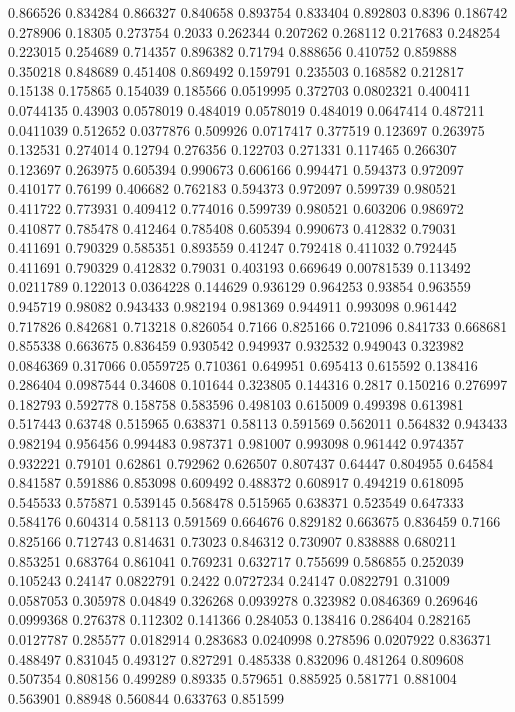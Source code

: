 0.866526 0.834284
0.866327 0.840658
0.893754 0.833404
0.892803 0.8396
0.186742 0.278906
0.18305 0.273754
0.2033 0.262344
0.207262 0.268112
0.217683 0.248254
0.223015 0.254689
0.714357 0.896382
0.71794 0.888656
0.410752 0.859888
0.350218 0.848689
0.451408 0.869492
0.159791 0.235503
0.168582 0.212817
0.15138 0.175865
0.154039 0.185566
0.0519995 0.372703
0.0802321 0.400411
0.0744135 0.43903
0.0578019 0.484019
0.0578019 0.484019
0.0647414 0.487211
0.0411039 0.512652
0.0377876 0.509926
0.0717417 0.377519
0.123697 0.263975
0.132531 0.274014
0.12794 0.276356
0.122703 0.271331
0.117465 0.266307
0.123697 0.263975
0.605394 0.990673
0.606166 0.994471
0.594373 0.972097
0.410177 0.76199
0.406682 0.762183
0.594373 0.972097
0.599739 0.980521
0.411722 0.773931
0.409412 0.774016
0.599739 0.980521
0.603206 0.986972
0.410877 0.785478
0.412464 0.785408
0.605394 0.990673
0.412832 0.79031
0.411691 0.790329
0.585351 0.893559
0.41247 0.792418
0.411032 0.792445
0.411691 0.790329
0.412832 0.79031
0.403193 0.669649
0.00781539 0.113492
0.0211789 0.122013
0.0364228 0.144629
0.936129 0.964253
0.93854 0.963559
0.945719 0.98082
0.943433 0.982194
0.981369 0.944911
0.993098 0.961442
0.717826 0.842681
0.713218 0.826054
0.7166 0.825166
0.721096 0.841733
0.668681 0.855338
0.663675 0.836459
0.930542 0.949937
0.932532 0.949043
0.323982 0.0846369
0.317066 0.0559725
0.710361 0.649951
0.695413 0.615592
0.138416 0.286404
0.0987544 0.34608
0.101644 0.323805
0.144316 0.2817
0.150216 0.276997
0.182793 0.592778
0.158758 0.583596
0.498103 0.615009
0.499398 0.613981
0.517443 0.63748
0.515965 0.638371
0.58113 0.591569
0.562011 0.564832
0.943433 0.982194
0.956456 0.994483
0.987371 0.981007
0.993098 0.961442
0.974357 0.932221
0.79101 0.62861
0.792962 0.626507
0.807437 0.64447
0.804955 0.64584
0.841587 0.591886
0.853098 0.609492
0.488372 0.608917
0.494219 0.618095
0.545533 0.575871
0.539145 0.568478
0.515965 0.638371
0.523549 0.647333
0.584176 0.604314
0.58113 0.591569
0.664676 0.829182
0.663675 0.836459
0.7166 0.825166
0.712743 0.814631
0.73023 0.846312
0.730907 0.838888
0.680211 0.853251
0.683764 0.861041
0.769231 0.632717
0.755699 0.586855
0.252039 0.105243
0.24147 0.0822791
0.2422 0.0727234
0.24147 0.0822791
0.31009 0.0587053
0.305978 0.04849
0.326268 0.0939278
0.323982 0.0846369
0.269646 0.0999368
0.276378 0.112302
0.141366 0.284053
0.138416 0.286404
0.282165 0.0127787
0.285577 0.0182914
0.283683 0.0240998
0.278596 0.0207922
0.836371 0.488497
0.831045 0.493127
0.827291 0.485338
0.832096 0.481264
0.809608 0.507354
0.808156 0.499289
0.89335 0.579651
0.885925 0.581771
0.881004 0.563901
0.88948 0.560844
0.633763 0.851599
